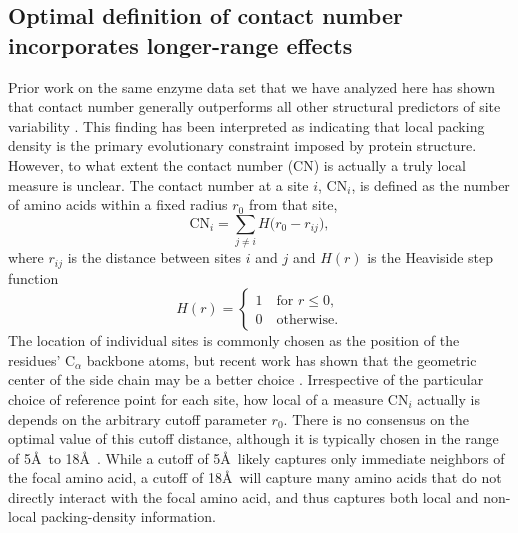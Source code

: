 \documentclass[12pt]{article}
\begin{document}
\subsection*{Optimal definition of contact number incorporates longer-range effects}

Prior work on the same enzyme data set that we have analyzed here has shown that contact number generally outperforms all other structural predictors of site variability \cite{yeh_site-specific_2014, yeh_local_2014, huang_mechanistic_2014}. This finding has been interpreted as indicating that local packing density is the primary evolutionary constraint imposed by protein structure. However, to what extent the contact number (CN) is actually a truly local measure is unclear. The contact number at a site $i$, CN$_i$, is defined as the number of amino acids within a fixed radius $r_0$ from that site,
    \begin{equation}
        \label{eqn:cn}
        \text{CN}_{i} = \sum_{j\neq i} H\big(r_0-r_{ij}\big),
    \end{equation}
where $r_{ij}$ is the distance between sites $i$ and $j$ and $H(r)$ is the Heaviside step function
    \begin{equation}
        \label{eqn:heaviside}
        H(r) = \begin{cases}
        			1 \quad\text{for $r\leq 0$,}\\
                    0 \quad\text{otherwise.}
               \end{cases}
    \end{equation}
The location of individual sites is commonly chosen as the position of the residues' C$_\alpha$ backbone atoms, but recent work has shown that the geometric center of the side chain may be a better choice \cite{marcos_too_2015}. Irrespective of the particular choice of reference point for each site, how local of a measure CN$_i$ actually is depends on the arbitrary cutoff parameter $r_0$. There is no consensus on the optimal value of this cutoff distance, although it is typically chosen in the range of 5\AA\ to 18\AA\ \cite{lin_deriving_2008, franzosa_structural_2009, weng_molecular_2014, yeh_local_2014}. While a cutoff of 5\AA\ likely captures only immediate neighbors of the focal amino acid, a cutoff of 18\AA\ will capture many amino acids that do not directly interact with the focal amino acid, and thus captures both local and non-local packing-density information.
\end{document}
